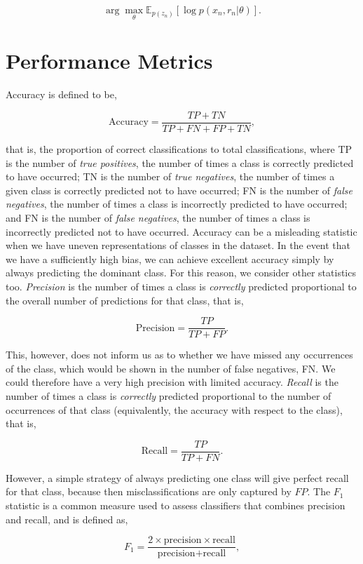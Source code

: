 \documentclass[11pt]{amsart}
\begin{document}
$$\arg \max_\theta \mathbb{E}_{p(z_n)}[\log p(x_n, r_n | \theta)].$$

\section{Performance Metrics}

Accuracy is defined to be,

$$
\text{Accuracy} = \frac{TP + TN}{TP + FN + FP + TN},
$$

that is, the proportion of correct classifications to total classifications, where TP is the number of \emph{true positives}, the number of times a class is correctly predicted to have occurred; TN is the number of \emph{true negatives}, the number of times a given class is correctly predicted not to have occurred; FN is the number of \emph{false negatives}, the number of times a class is incorrectly predicted to have occurred; and FN is the number of \emph{false negatives}, the number of times a class is incorrectly predicted not to have occurred. Accuracy can be a misleading statistic when we have uneven representations of classes in the dataset. In the event that we have a sufficiently high bias, we can achieve excellent accuracy simply by always predicting the dominant class. For this reason, we consider other statistics too. \emph{Precision} is the number of times a class is \emph{correctly} predicted proportional to the overall number of predictions for that class, that is,

$$
\text{Precision} = \frac{TP}{TP + FP}.
$$

This, however, does not inform us as to whether we have missed any occurrences of the class, which would be shown in the number of false negatives, FN. We could therefore have a very high precision with limited accuracy. \emph{Recall} is the number of times a class is \emph{correctly} predicted proportional to the number of occurrences of that class (equivalently, the accuracy with respect to the class), that is,

$$
\text{Recall} = \frac{TP}{TP + FN}.
$$

However, a simple strategy of always predicting one class will give perfect recall for that class, because then misclassifications are only captured by $FP$. The $F_1$ statistic is a common measure used to assess classifiers that combines precision and recall, and is defined as,

$$
F_1 = \frac{2 \times \text{precision} \times \text{recall}}{\text{precision} + \text{recall}},
$$
\end{document}
